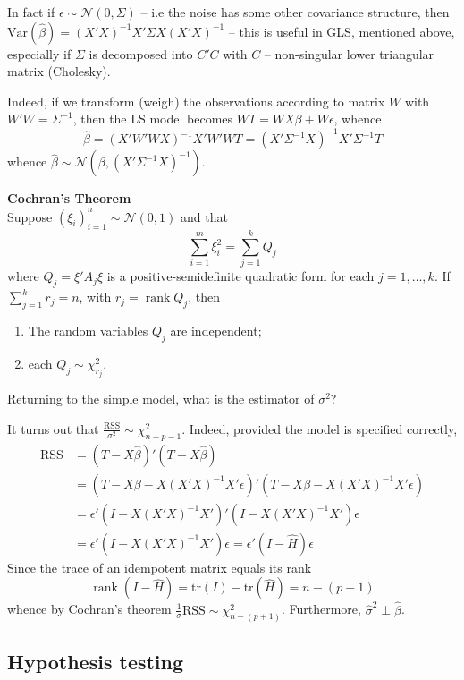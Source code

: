 \documentclass[a4paper]{article}
\newcommand{\brac}[1]{{\left ( #1 \right )}}
\newcommand{\Ncal}{\mathcal{N}}
\newcommand{\Var}[0]{{\text{Var}}}
\newcommand{\RSS}{\text{RSS}}
\newcommand{\tr}{\text{tr}}
\newcommand{\rank}{\mathop{\text{rank}}\nolimits}
\begin{document}
In fact if $\epsilon\sim \Ncal\brac{0,\Sigma}$ -- i.e the noise has some other
covariance structure, then $\Var(\hat{\beta}) = \brac{X'X}^{-1}X'\Sigma X\brac{X'X}^{-1}$
-- this is useful in GLS, mentioned above, especially if $\Sigma$ is decomposed
into $C'C$ with $C$ -- non-singular lower triangular matrix (Cholesky).

Indeed, if we transform (weigh) the observations according to matrix $W$ with
$W'W = \Sigma^{-1}$, then the LS model becomes $WT=WX\beta + W\epsilon$, whence
\[\hat{\beta} = \brac{X'W'WX}^{-1}X'W'WT = \brac{X'\Sigma^{-1}X}^{-1}X'\Sigma^{-1}T\]
whence $\hat{\beta}\sim\Ncal\brac{\beta, \brac{X'\Sigma^{-1}X}^{-1}}$.

\noindent\textbf{Cochran's Theorem} \hfill\\
Suppose $\brac{\xi_i}_{i=1}^n \sim\Ncal(0, 1)$ and that
\[\sum_{i=1}^m \xi_i^2 = \sum_{j=1}^k Q_j\]
where $Q_j = \xi' A_j \xi$ is a positive-semidefinite quadratic form for each $j=1,\ldots,k$.
If $\sum_{j=1}^k r_j = n$, with $r_j = \rank{Q_j}$, then \begin{enumerate}
	\item The random variables $Q_j$ are independent;
	\item each $Q_j\sim \chi^2_{r_j}$.
\end{enumerate}

Returning to the simple model, what is the estimator of $\sigma^2$?

It turns out that $\frac{\RSS}{\sigma^2}\sim \chi^2_{n-p-1}$.
Indeed, provided the model is specified correctly, \begin{align*}
	\RSS &= \brac{T-X\hat{\beta}}'\brac{T-X\hat{\beta}} \\
	& = \brac{T-X\beta - X\brac{X'X}^{-1}X'\epsilon}'\brac{T-X\beta - X\brac{X'X}^{-1}X'\epsilon} \\
	& = \epsilon' \brac{I - X\brac{X'X}^{-1}X'}'\brac{I - X\brac{X'X}^{-1}X'}\epsilon \\
	& = \epsilon' \brac{ I - X\brac{X'X}^{-1}X' } \epsilon = \epsilon' \brac{ I - \hat{H} } \epsilon
\end{align*}
Since the trace of an idempotent matrix equals its rank
\[\rank(I - \hat{H}) = \tr(I) - \tr(\hat{H}) = n- (p+1)\]
whence by Cochran's theorem $\frac{1}{\sigma}\RSS\sim\chi^2_{n-(p+1)}$.
Furthermore, $\hat{\sigma}^2 \perp \hat{\beta}$.

\subsection{Hypothesis testing} %
\label{sub:hypothesis_testing}
\end{document}
